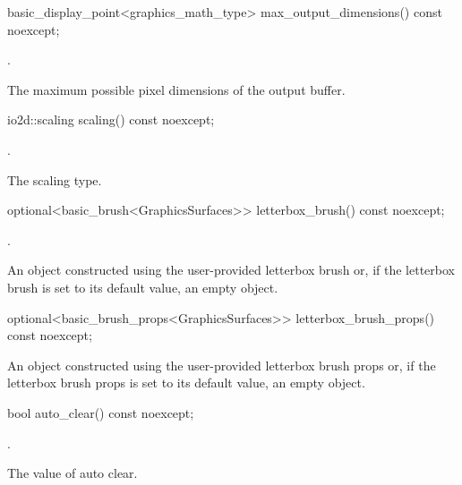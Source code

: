 %
\begin{itemdecl}
basic_display_point<graphics_math_type> max_output_dimensions() const noexcept;
\end{itemdecl}
\begin{itemdescr}
\pnum
\returns {}.

\pnum
\remarks The maximum possible pixel dimensions of the output buffer.
\end{itemdescr}

%
\begin{itemdecl}
io2d::scaling scaling() const noexcept;
\end{itemdecl}
\begin{itemdescr}
\pnum
\returns {}.

\pnum
\remarks The scaling type.
\end{itemdescr}

%
\begin{itemdecl}
optional<basic_brush<GraphicsSurfaces>> letterbox_brush() const noexcept;
\end{itemdecl}
\begin{itemdescr}
\pnum
\returns {}.

\pnum
\remarks An  object constructed using the user-provided letterbox brush or, if the letterbox brush is set to its default value, an empty  object.
\end{itemdescr}

%
\begin{itemdecl}
optional<basic_brush_props<GraphicsSurfaces>> letterbox_brush_props() const noexcept;
\end{itemdecl}
\begin{itemdescr}
\pnum
\returns
An  object constructed using the user-provided letterbox brush props or, if the letterbox brush props is set to its default value, an empty  object.
\end{itemdescr}

%
\begin{itemdecl}
bool auto_clear() const noexcept;
\end{itemdecl}
\begin{itemdescr}
\pnum
\returns {}.

\pnum
\remarks The value of auto clear.
\end{itemdescr}
